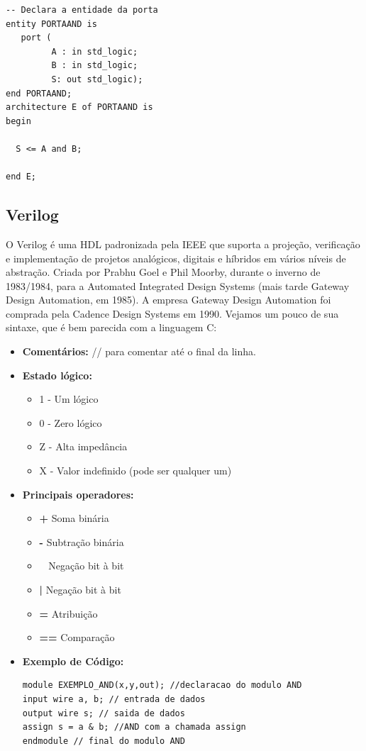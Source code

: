 \documentclass[12pt,a4paper]{article}
\begin{document}
\begin{itemize}
\begin{verbatim}
-- Declara a entidade da porta
entity PORTAAND is
   port ( 
         A : in std_logic;
         B : in std_logic;
         S: out std_logic);
end PORTAAND;
architecture E of PORTAAND is
begin

  S <= A and B;

end E;
\end{verbatim}
\end{itemize}

\subsection{Verilog}
O Verilog é uma HDL padronizada pela IEEE que suporta a projeção, verificação e implementação de projetos analógicos, digitais e híbridos em vários níveis de abstração.  Criada por Prabhu Goel e Phil Moorby, durante o inverno de 1983/1984, para a Automated Integrated Design Systems (mais tarde Gateway Design Automation, em 1985). A empresa Gateway Design Automation foi comprada pela Cadence Design Systems em 1990. Vejamos um pouco de sua sintaxe, que é bem parecida com a linguagem C:
\begin{itemize}
\item {\bf Comentários:} // para comentar até o final da linha.
\item {\bf Estado lógico:}
\begin{itemize}
\item 1 - Um lógico
\item 0 - Zero lógico
\item Z - Alta impedância
\item X - Valor indefinido (pode ser qualquer um)
\end{itemize}
\item {\bf Principais operadores:}
\begin{itemize}
\item  {\bf +} \quad Soma binária
\item  {\bf -} \quad Subtração binária
\item  {\bf ~} \quad Negação bit à bit
\item  {\bf |} \quad Negação bit à bit
\item  {\bf =} \quad Atribuição
\item  {\bf ==} \quad Comparação
\end{itemize}
\item {\bf Exemplo de Código:}
\begin{verbatim} 
module EXEMPLO_AND(x,y,out); //declaracao do modulo AND
input wire a, b; // entrada de dados
output wire s; // saida de dados
assign s = a & b; //AND com a chamada assign
endmodule // final do modulo AND
\end{verbatim}
\end{itemize}
\end{document}
